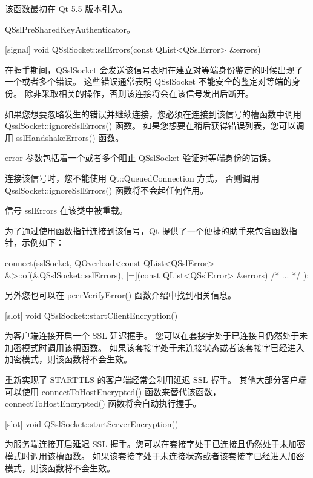 该函数最初在 Qt 5.5 版本引入。

\begin{seeAlso}
QSslPreSharedKeyAuthenticator。
\end{seeAlso}

[signal] void QSslSocket::sslErrors(const QList<QSslError> \&errors)

在握手期间，QSslSocket 会发送该信号表明在建立对等端身份鉴定的时候出现了一个或者多个错误。
这些错误通常表明 QSslSocket 不能安全的鉴定对等端的身份。
除非采取相关的操作，否则该连接将会在该信号发出后断开。

如果您想要忽略发生的错误并继续连接，您必须在连接到该信号的槽函数中调用 QsslSocket::ignoreSslErrors() 函数。
如果您想要在稍后获得错误列表，您可以调用 sslHandshakeErrors() 函数。

error 参数包括着一个或者多个阻止 QSslSocket 验证对等端身份的错误。

\begin{notice}
连接该信号时，您不能使用 Qt::QueuedConnection 方式，
否则调用 QsslSocket::ignoreSslErrors() 函数将不会起任何作用。
\end{notice}

\begin{notice}
信号 sslErrors 在该类中被重载。
\end{notice}

为了通过使用函数指针连接到该信号，Qt 提供了一个便捷的助手来包含函数指针，示例如下：

\begin{cppcode}
connect(sslSocket, QOverload<const QList<QSslError> &>::of(&QSslSocket::sslErrors),
     [=](const QList<QSslError> &errors){ /* ... */ });
\end{cppcode}



另外您也可以在 peerVerifyError() 函数介绍中找到相关信息。

[slot] void QSslSocket::startClientEncryption()

为客户端连接开启一个 SSL 延迟握手。
您可以在套接字处于已连接且仍然处于未加密模式时调用该槽函数。
如果该套接字处于未连接状态或者该套接字已经进入加密模式，则该函数将不会生效。

重新实现了 STARTTLS 的客户端经常会利用延迟 SSL 握手。
其他大部分客户端可以使用 connectToHostEncrypted() 函数来替代该函数，
connectToHostEncrypted() 函数将会自动执行握手。

[slot] void QSslSocket::startServerEncryption()

为服务端连接开启延迟 SSL 握手。您可以在套接字处于已连接且仍然处于未加密模式时调用该槽函数。
如果该套接字处于未连接状态或者该套接字已经进入加密模式，则该函数将不会生效。

